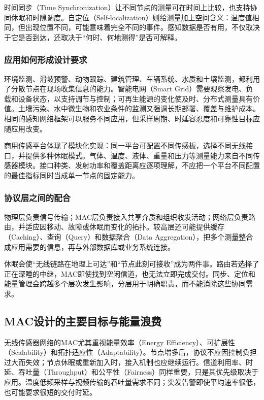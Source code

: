 时间同步（Time Synchronization）让不同节点的测量可在时间上比较，也支持协同休眠和时隙调度。自定位（Self-localization）则给测量加上空间含义：温度值相同，但出现位置不同，可能意味着完全不同的事件。感知数据是否有用，不仅取决于它是否到达，还取决于“何时、何地测得”是否可解释。

\subsubsection{应用如何形成设计要求}

环境监测、滑坡预警、动物跟踪、建筑管理、车辆系统、水质和土壤监测，都利用了分散节点在现场收集信息的能力。智能电网（Smart Grid）需要观察发电、负载和设备状态，以支持调节与控制；可再生能源的变化使及时、分布式测量具有价值。土壤污染、水中微生物和农业条件的监测又强调长期部署、覆盖与维护成本。相同的感知网络框架可以服务不同应用，但采样周期、时延容忍度和可靠性目标应随应用改变。

商用传感平台体现了模块化实现：同一平台可配置不同传感板，选择不同无线接口，并提供多种休眠模式。气体、温度、液体、重量和压力等测量能力来自不同传感器模块。接口种类、发射功率和覆盖距离应逐项理解，不应把一个平台不同配置的最佳指标同时当成单一节点的固定能力。

\subsubsection{协议层之间的配合}

物理层负责信号传输；MAC层负责接入共享介质和组织收发活动；网络层负责路由，并适应因移动、故障或休眠而变化的拓扑。较高层还可能提供缓存（Caching）、查询（Query）和数据聚合（Data Aggregation），把多个测量整合成应用需要的信息，再与外部数据库或业务系统连接。

休眠会使“无线链路在地理上可达”和“节点此刻可接收”成为两件事。路由若选择了正在深睡的中继，MAC即使找到空闲信道，也无法立即完成交付。同步、定位和能量管理会跨越多个层次发生影响，分层用于明确职责，而不能消除这些协同需求。

\subsection{MAC设计的主要目标与能量浪费}

无线传感器网络的MAC尤其重视能量效率（Energy Efficiency）、可扩展性（Scalability）和拓扑适应性（Adaptability）。节点增多后，协议不应因控制负担过大而失效；节点休眠或重新加入时，接入机制也应继续运行。信道利用率、时延、吞吐量（Throughput）和公平性（Fairness）同样重要，只是其优先级取决于应用。温度低频采样与视频传输的吞吐量需求不同；突发告警即使平均速率很低，也可能要求很短的交付时延。

